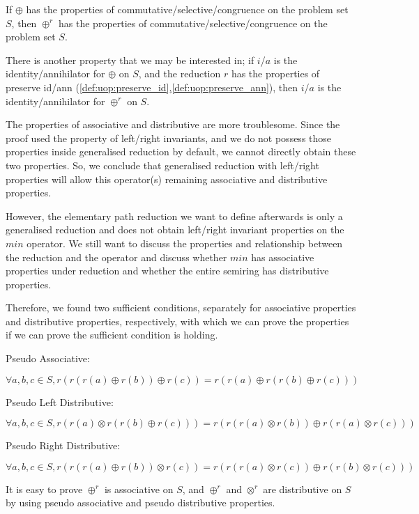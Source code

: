 \documentclass[a4paper,12pt,twoside,openright]{report}
\newcommand{\e}[2]{
\begin{equation}
  \label{#1} 
  #2
\end{equation}
}
\begin{document}
If $\oplus$ has the properties of commutative/selective/congruence on the problem set $S$, then $\oplus^r$ has the properties of commutative/selective/congruence on the problem set $S$.

There is another property that we may be interested in; if $i$/$a$ is the identity/annihilator for $\oplus$ on $S$, and the reduction $r$ has the properties of preserve id/ann (\ref{def:uop:preserve_id},\ref{def:uop:preserve_ann}), then $i$/$a$ is the identity/annihilator for $\oplus^r$ on $S$.

The properties of associative and distributive are more troublesome. Since the proof used the property of left/right invariants, and we do not possess those properties inside generalised reduction by default, we cannot directly obtain these two properties. So, we conclude that generalised reduction with left/right properties will allow this operator(s) remaining associative and distributive properties.

However, the elementary path reduction we want to define afterwards is only a generalised reduction and does not obtain left/right invariant properties on the $min$ operator. We still want to discuss the properties and relationship between the reduction and the operator and discuss whether $min$ has associative properties under reduction and whether the entire semiring has distributive properties.

Therefore, we found two sufficient conditions, separately for associative properties and distributive properties, respectively, with which we can prove the properties if we can prove the sufficient condition is holding.

Pseudo Associative:
\e{gr:def:pseudo_associative}{\forall a,b,c \in S, r(r(r(a)\oplus r(b)) \oplus r(c)) = r(r(a) \oplus r(r(b)\oplus r(c)))}
Pseudo Left Distributive: 
\e{gr:def:pseudo_left_distributive}{\forall a,b,c \in S, r(r(a) \otimes r(r(b)\oplus r(c))) = r(r(r(a) \otimes r(b)) \oplus r(r(a) \otimes r(c)))}
Pseudo Right Distributive: 
\e{gr:def:pseudo_right_distributive}{\forall a,b,c \in S, r(r(r(a) \oplus r(b)) \otimes r(c)) = r(r(r(a) \otimes r(c)) \oplus r(r(b) \otimes r(c)))}
It is easy to prove $\oplus^r$ is associative on $S$, and $\oplus^r$ and $\otimes^r$ are distributive on $S$ by using pseudo associative and pseudo distributive properties.
\end{document}
